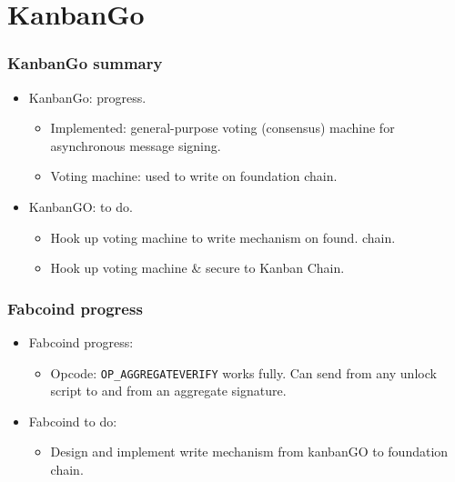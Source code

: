 \section{KanbanGo}
\begin{frame}[fragile]
\frametitle{KanbanGo summary}
\begin{itemize}
\item KanbanGo: progress.
\begin{itemize}
\item Implemented: general-purpose voting (consensus) machine for asynchronous message signing. \item Voting machine: used to write on foundation chain.
\end{itemize}
\item KanbanGO: to do.
\begin{itemize}
\item Hook up voting machine to write mechanism on found. chain.
\item Hook up voting machine \& secure to Kanban Chain.
\end{itemize}
\end{itemize}

\end{frame}


\begin{frame}[fragile]
\frametitle{Fabcoind progress}
\begin{itemize}
\item Fabcoind progress:
\begin{itemize}
\item Opcode: \verb|OP_AGGREGATEVERIFY| works fully. Can send from any unlock script to and from an aggregate signature.
\end{itemize}
\item Fabcoind to do:
\begin{itemize}
\item Design and implement write mechanism from kanbanGO to foundation chain.
\end{itemize}
\end{itemize}
\end{frame}

